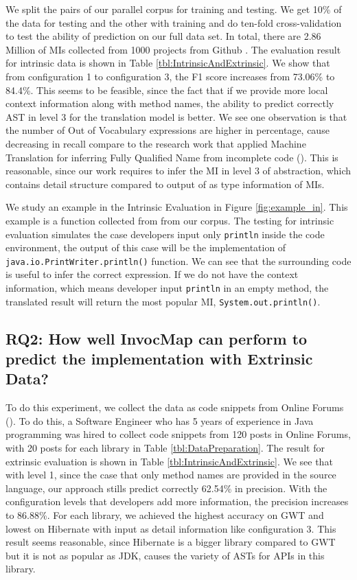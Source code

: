 We split the pairs of our parallel corpus for training and testing. We get 10\% of the data for testing and the other with training and do ten-fold cross-validation to test the ability of prediction on our full data set. In total, there are 2.86 Million of MIs collected from 1000 projects from Github \cite{id:Github}.
The evaluation result for intrinsic data is shown in Table \ref{tbl:IntrinsicAndExtrinsic}. We show that from configuration 1 to configuration 3, the F1 score increases from 73.06\% to 84.4\%. This seems to be feasible, since the fact that if we provide more local context information along with method names, the ability to predict correctly AST in level 3 for the translation model is better. We see one observation is that the number of Out of Vocabulary expressions are higher in percentage, cause decreasing in recall compare to the research work that applied Machine Translation for inferring Fully Qualified Name from incomplete code (\cite{8453132}). This is reasonable, since our work requires to infer the MI in level 3 of abstraction, which contains detail structure compared to output of \cite{8453132} as type information of MIs. 

We study an example in the Intrinsic Evaluation in Figure \ref{fig:example_in}. This example is a function collected from \cite{id:IntrinsicAndroidExample} from our corpus. The testing for intrinsic evaluation simulates the case developers input only \texttt{println} inside the code environment, the output of this case will be the implementation of \texttt{java.io.PrintWriter.println()} function. We can see that the surrounding code is useful to infer the correct expression. If we do not have the context information, which means developer input \texttt{println} in an empty method, the translated result will return the most popular MI, \texttt{System.out.println()}.

\subsection{RQ2: How well InvocMap can perform to predict the implementation with Extrinsic Data?}

To do this experiment, we collect the data as code snippets from Online Forums (\cite{id:StackOverflow,id:ProgramCreek,id:GeeksForGeeks}). To do this, a Software Engineer who has 5 years of experience in Java programming was hired to collect code snippets from 120 posts in Online Forums, with 20 posts for each library in Table \ref{tbl:DataPreparation}. The result for extrinsic evaluation is shown in Table \ref{tbl:IntrinsicAndExtrinsic}. We see that with level 1, since the case that only method names are provided in the source language, our approach stills predict correctly 62.54\% in precision. With the configuration levels that developers add more information, the precision increases to 86.88\%. For each library, we achieved the highest accuracy on GWT and lowest on Hibernate with input as detail information like configuration 3. This result seems reasonable, since Hibernate is a bigger library compared to GWT but it is not as popular as JDK, causes the variety of ASTs for APIs in this library.

